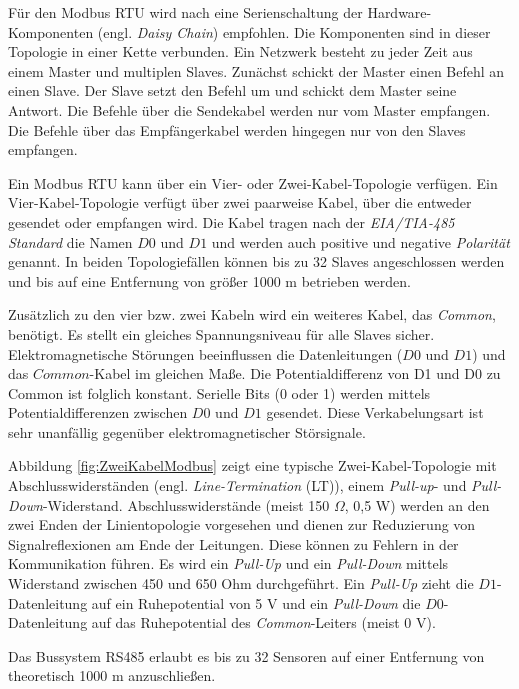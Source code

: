 Für den Modbus RTU wird nach \citep{MODBUS.ORG2002} eine Serienschaltung der Hardware-Komponenten (engl. \textit{Daisy Chain}) empfohlen. Die Komponenten sind in dieser Topologie in einer Kette verbunden. Ein Netzwerk besteht zu jeder Zeit aus einem Master und multiplen Slaves. Zunächst schickt der Master einen Befehl an einen Slave. Der Slave setzt den Befehl um und schickt dem Master seine Antwort. Die Befehle über die Sendekabel werden nur vom Master empfangen. Die Befehle über das Empfängerkabel werden hingegen nur von den Slaves empfangen.
 
Ein Modbus RTU kann über ein Vier- oder Zwei-Kabel-Topologie verfügen. Ein Vier-Kabel-Topologie verfügt über zwei paarweise Kabel, über die entweder gesendet oder empfangen wird. Die Kabel tragen nach der \textit{EIA/TIA-485 Standard} die Namen $D0$ und $D1$ und werden auch positive und negative \textit{Polarität} genannt. In beiden Topologiefällen können bis zu 32 Slaves angeschlossen werden und bis auf eine Entfernung von größer 1000 m betrieben werden. 

Zusätzlich zu den vier bzw. zwei Kabeln wird ein weiteres Kabel, das \textit{Common}, benötigt. Es stellt ein gleiches Spannungsniveau für alle Slaves sicher. Elektromagnetische Störungen beeinflussen die Datenleitungen ($D0$ und $D1$) und das $Common$-Kabel im gleichen Maße. Die Potentialdifferenz von D1 und D0 zu Common ist folglich konstant. Serielle Bits (0 oder 1) werden mittels Potentialdifferenzen zwischen $D0$ und $D1$ gesendet. Diese Verkabelungsart ist sehr unanfällig gegenüber elektromagnetischer Störsignale. 

Abbildung \ref{fig:ZweiKabelModbus} zeigt eine typische Zwei-Kabel-Topologie mit Abschlusswiderständen (engl. \textit{Line-Termination} (LT)), einem \textit{Pull-up}- und \textit{Pull-Down}-Widerstand.  Abschlusswiderstände (meist 150 $\Omega$, 0,5 W) werden an den zwei Enden der Linientopologie vorgesehen und dienen zur Reduzierung von Signalreflexionen am Ende der Leitungen. Diese können zu Fehlern in der Kommunikation führen. 
Es wird ein \textit{Pull-Up} und ein \textit{Pull-Down} mittels Widerstand zwischen 450 und 650 Ohm durchgeführt. Ein \textit{Pull-Up} zieht die $D1$-Datenleitung auf ein Ruhepotential von 5 V und ein \textit{Pull-Down} die $D0$-Datenleitung auf das Ruhepotential des \textit{Common}-Leiters (meist 0 V).

Das Bussystem RS485 erlaubt es bis zu 32 Sensoren auf einer Entfernung von theoretisch 1000 m anzuschließen.